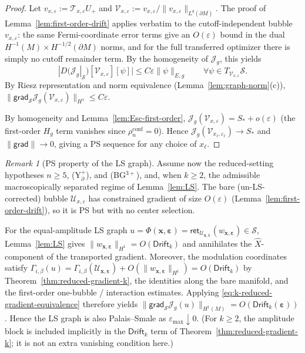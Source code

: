 \documentclass[11pt,reqno,a4paper]{amsart}
\numberwithin{equation}{section}
\theoremstyle{plain}
\theoremstyle{remark}
\newtheorem{remark}[theorem]{Remark}
\theoremstyle{plain}
\begin{document}
\begin{proof}
Let $v_{x,\varepsilon}:=\mathcal T_{x,\varepsilon}U_+$ and
$\mathcal V_{x,\varepsilon}:=v_{x,\varepsilon}/\|v_{x,\varepsilon}\|_{L^q(\partial M)}$.
The proof of Lemma~\ref{lem:first-order-drift} applies verbatim to the
cutoff-independent bubble $v_{x,\varepsilon}$:
the same Fermi-coordinate error terms give an $O(\varepsilon)$ bound in the dual
$H^{-1}(M)\times H^{-1/2}(\partial M)$ norms, and for the full transferred optimizer
there is simply no cutoff remainder term.
By the homogeneity of $\mathcal J_g$, this yields
\[
|D(\mathcal J_g|_{\mathcal S})[\mathcal V_{x,\varepsilon}][\psi]|
\le C\varepsilon\|\psi\|_{E,g}
\qquad\forall\psi\in T_{\mathcal V_{x,\varepsilon}}\mathcal S.
\]
By Riesz representation and norm equivalence
(Lemma~\ref{lem:graph-norm}\textup{(c)}),
$\|\mathsf{grad}_{\mathcal S}\mathcal J_g(\mathcal V_{x,\varepsilon})\|_{H^1}\le C\varepsilon$.

By homogeneity and Lemma~\ref{lem:Esc-first-order},
$\mathcal J_g(\mathcal V_{x,\varepsilon})
=S_\ast+o(\varepsilon)$
(the first-order $H_g$ term vanishes since $\rho_n^{\mathrm{conf}}=0$).
Hence $\mathcal J_g(\mathcal V_{x_\ell,\varepsilon_\ell})\to S_\ast$
and $\|\mathsf{grad}\|\to0$, giving a PS sequence for any choice of $x_\ell$.
\end{proof}

\begin{remark}[PS property of the LS graph]\label{rem:PS-LS-graph}
Assume now the reduced-setting hypotheses $n\ge5$, \textup{(Y$^+_{\partial}$)},
and \textup{(BG$^{3+}$)}, and, when $k\ge2$, the admissible
macroscopically separated regime of Lemma~\ref{lem:LS}.
The bare (un-LS-corrected) bubble $\mathcal U_{x,\varepsilon}$
has constrained gradient of size $O(\varepsilon)$
(Lemma~\ref{lem:first-order-drift}), so it is PS but with no center selection.

For the equal-amplitude LS graph
$u=\Phi(\mathbf x,\boldsymbol\varepsilon)
=\mathsf{ret}_{\mathcal U_{\mathbf x,\boldsymbol\varepsilon}}
(w_{\mathbf x,\boldsymbol\varepsilon})\in\mathcal S$,
Lemma~\ref{lem:LS} gives $\|w_{\mathbf x,\boldsymbol\varepsilon}\|_{H^1}
=O(\mathsf{Drift}_k)$ and annihilates the $\widehat X$-component of the transported gradient.
Moreover, the modulation coordinates satisfy
$\Gamma_{i,\beta}(u)
=\Gamma_{i,\beta}(\mathcal U_{\mathbf x,\boldsymbol\varepsilon})
+O(\|w_{\mathbf x,\boldsymbol\varepsilon}\|_{H^1})
=O(\mathsf{Drift}_k)$
by Theorem~\ref{thm:reduced-gradient-k}, the identities along the bare manifold,
and the first-order one-bubble / interaction estimates.
Applying \eqref{eq:k-reduced-gradient-equivalence} therefore yields
$\|\mathsf{grad}_{\mathcal S}\mathcal J_g(u)\|_{H^1(M)}
=O(\mathsf{Drift}_k(\boldsymbol\varepsilon))$.
Hence the LS graph is also Palais--Smale as $\varepsilon_{\max}\downarrow0$.
(For $k\ge2$, the amplitude block is included implicitly in the
$\mathsf{Drift}_k$ term of Theorem~\ref{thm:reduced-gradient-k}; it is not an extra vanishing condition here.)
\end{remark}
\end{document}
